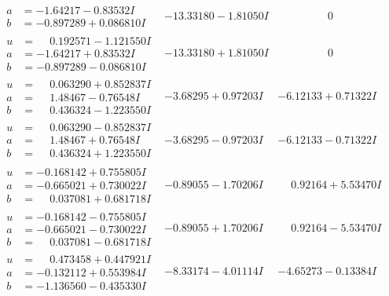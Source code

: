 \documentclass[1p]{elsarticle_modified}
\theoremstyle{definition}
\begin{document}
$$\begin{array}{c|c|c}
\begin{aligned}
a &= -1.64217 - 0.83532 I \\
b &= -0.897289 + 0.086810 I\end{aligned}
 & -13.33180 - 1.81050 I & \phantom{-0.000000 } 0 \\ \hline\begin{aligned}
u &= \phantom{-}0.192571 - 1.121550 I \\
a &= -1.64217 + 0.83532 I \\
b &= -0.897289 - 0.086810 I\end{aligned}
 & -13.33180 + 1.81050 I & \phantom{-0.000000 } 0 \\ \hline\begin{aligned}
u &= \phantom{-}0.063290 + 0.852837 I \\
a &= \phantom{-}1.48467 - 0.76548 I \\
b &= \phantom{-}0.436324 - 1.223550 I\end{aligned}
 & -3.68295 + 0.97203 I & -6.12133 + 0.71322 I \\ \hline\begin{aligned}
u &= \phantom{-}0.063290 - 0.852837 I \\
a &= \phantom{-}1.48467 + 0.76548 I \\
b &= \phantom{-}0.436324 + 1.223550 I\end{aligned}
 & -3.68295 - 0.97203 I & -6.12133 - 0.71322 I \\ \hline\begin{aligned}
u &= -0.168142 + 0.755805 I \\
a &= -0.665021 + 0.730022 I \\
b &= \phantom{-}0.037081 + 0.681718 I\end{aligned}
 & -0.89055 - 1.70206 I & \phantom{-}0.92164 + 5.53470 I \\ \hline\begin{aligned}
u &= -0.168142 - 0.755805 I \\
a &= -0.665021 - 0.730022 I \\
b &= \phantom{-}0.037081 - 0.681718 I\end{aligned}
 & -0.89055 + 1.70206 I & \phantom{-}0.92164 - 5.53470 I \\ \hline\begin{aligned}
u &= \phantom{-}0.473458 + 0.447921 I \\
a &= -0.132112 + 0.553984 I \\
b &= -1.136560 - 0.435330 I\end{aligned}
 & -8.33174 - 4.01114 I & -4.65273 - 0.13384 I \\ \hline\begin{aligned}

\end{aligned}
\end{array}$$
\end{document}
